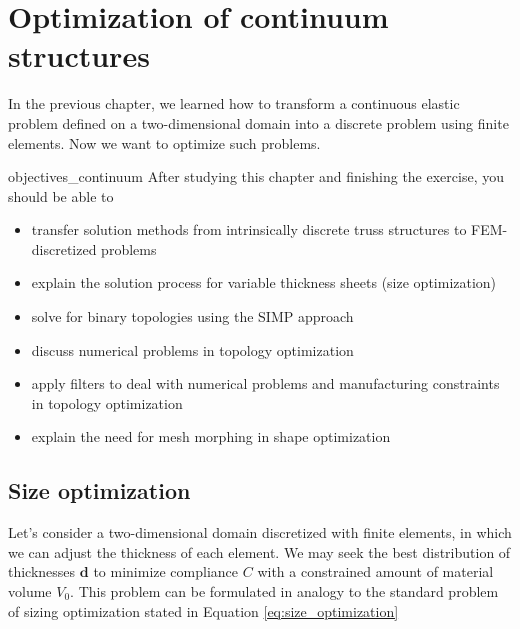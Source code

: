 \chapter{Optimization of continuum structures}
In the previous chapter, we learned how to transform a continuous elastic problem defined on a two-dimensional domain into a discrete problem using finite elements. Now we want to optimize such problems.

\begin{objectives}{}{objectives_continuum}
After studying this chapter and finishing the exercise, you should be able to 
\begin{itemize}[label=$\dots$]
    \item transfer solution methods from intrinsically discrete truss structures to FEM-discretized problems
    \item explain the solution process for variable thickness sheets (size optimization) 
    \item solve for binary topologies using the SIMP approach
    \item discuss numerical problems in topology optimization
    \item apply filters to deal with numerical problems and manufacturing constraints in topology optimization
    \item explain the need for mesh morphing in shape optimization
\end{itemize}
\end{objectives}

\section{Size optimization}
\label{sec:variable_thickness_sheet}
Let's consider a two-dimensional domain discretized with finite elements, in which we can adjust the thickness of each element. We may seek the best distribution of thicknesses $\mathbf{d}$ to minimize compliance $C$ with a constrained amount of material volume $V_0$. This problem can be formulated in analogy to the standard problem of sizing optimization stated in Equation \eqref{eq:size_optimization}

